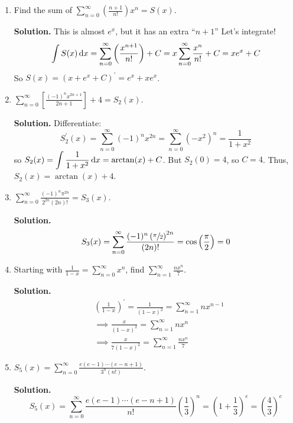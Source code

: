 \begin{Example}{}{}
    \begin{enumerate}[label=(\roman*)]
        \item Find the sum of $ \displaystyle \sum\limits_{n=0}^{\infty} \left( \frac{n+1}{n!} \right)x^n =S(x)$.

              \textbf{Solution.} This is almost $ e^x $, but it has an extra ``$ n+1 $'' Let's integrate!
              \[ \int S(x)\odif{x} =
                  \sum\limits_{n=0}^{\infty} \left( \frac{x^{n+1}}{n!}  \right) +C
                  =x \sum\limits_{n=0}^{\infty} \frac{x^n}{n!} +C
                  =x e^x+C \]
              So $ S(x)=(x+e^x+C)^\prime=e^x+xe^x $.

        \item $ \displaystyle \sum\limits_{n=0}^{\infty} \left[ \frac{(-1)^n x^{2n+1}}{2n+1} \right]+4
                  =S_2(x) $.

              \textbf{Solution.} Differentiate:
              \[ S_2^\prime(x)=\sum\limits_{n=0}^{\infty} (-1)^n x^{2n}=\sum\limits_{n=0}^{\infty} (-x^2)^n=
                  \frac{1}{1+x^2} \]
              so $ \displaystyle S_2(x)=\int \frac{1}{1+x^2} \odif{x} =\arctan(x)+C $. But $ S_2(0)=4 $,
              so $ C=4 $. Thus, $ S_2(x)=\arctan(x)+ 4 $.

        \item $ \displaystyle \sum\limits_{n=0}^{\infty} \frac{(-1)^n\pi^{2n}}{2^{2n}(2n)!}=S_3(x) $.

              \textbf{Solution.}
              \[ S_3(x)=\sum\limits_{n=0}^{\infty} \frac{(-1)^n\left( \sfrac{\pi}{2} \right)^{2n}}{(2n)!}
                  =\cos\left( \frac{\pi}{2} \right)=0  \]

        \item Starting with $ \displaystyle \frac{1}{1-x} =\sum\limits_{n=0}^{\infty} x^n $,
              find $ \displaystyle\sum\limits_{n=1}^{\infty} \frac{n x^n}{7} $.

              \textbf{Solution.}
              \begin{align*}
                   & \left( \frac{1}{1-x} \right)^\prime=\frac{1}{(1-x)^2}=
                  \sum\limits_{n=1}^{\infty} n x^{n-1}                                      \\
                   & \implies \frac{x}{(1-x)^2}=\sum\limits_{n=1}^{\infty} n x^n            \\
                   & \implies \frac{x}{7(1-x)^2} =\sum\limits_{n=1}^{\infty} \frac{nx^n}{7}
              \end{align*}
        \item $ \displaystyle S_5(x)=\sum\limits_{n=0}^{\infty}
                  \frac{e(e-1)\cdots(e-n+1)}{3^n (n!)}  $.

              \textbf{Solution.}
              \[ S_5(x)=\sum\limits_{n=0}^{\infty}
                  \frac{e(e-1)\cdots(e-n+1)}{n!}\left( \frac{1}{3}  \right)^n
                  =\left( 1+\frac{1}{3}  \right)^e
                  =\left( \frac{4}{3}  \right)^e \]

    \end{enumerate}
\end{Example}

